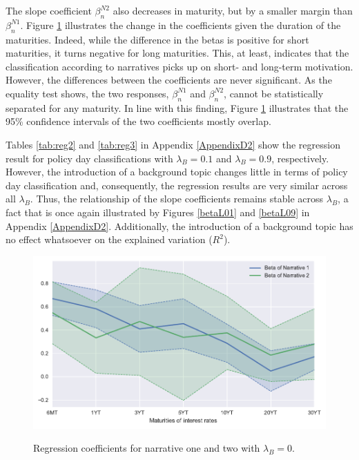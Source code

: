 \documentclass[11pt,a4paper,english,oneside]{book}
\numberwithin{equation}{chapter}
\begin{document}
The slope coefficient $\beta_n^{N2}$ also decreases in maturity, but by a smaller margin than $\beta_n^{N1}$. Figure \ref{betaL00} illustrates the change in the coefficients given the duration of the maturities. Indeed, while the difference in the betas is positive for short maturities, it turns negative for long maturities. This, at least, indicates that the classification according to narratives picks up on short- and long-term motivation. However, the differences between the coefficients are never significant. As the equality test shows, the two responses, $\beta_n^{N1}$ and $\beta_n^{N2}$, cannot be statistically separated for any maturity. In line with this finding, Figure \ref{betaL00} illustrates that the 95\% confidence intervals of the two coefficients mostly overlap. 

Tables \ref{tab:reg2} and \ref{tab:reg3} in Appendix \ref{AppendixD2} show the regression result for policy day classifications with $\lambda_B=0.1$ and $\lambda_B=0.9$, respectively. However, the introduction of a background topic changes little in terms of policy day classification and, consequently, the regression results are very similar across all $\lambda_B$. Thus, the relationship of the slope coefficients remains stable across $\lambda_B$, a fact that is once again illustrated by Figures \ref{betaL01} and \ref{betaL09} in Appendix \ref{AppendixD2}. Additionally, the introduction of a background topic has no effect whatsoever on the explained variation ($R^2$).

\begin{figure}
	\caption{Regression coefficients for narrative one and two with $\lambda_B=0$.}
	\centering
	\includegraphics[scale=1]{Images/betasLamb0_0.pdf}
	\label{betaL00}
\end{figure}
\end{document}
